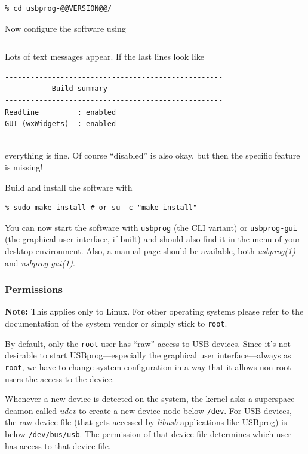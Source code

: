 \documentclass[bibtotoc,UKenglish,halfparskip,oneside,DIV12]{scrreprt}
\begin{document}
\begin{lstlisting}[style=inline]
% tar xvfj usbprog-@@VERSION@@.tar.bz2
% cd usbprog-@@VERSION@@/
\end{lstlisting}

Now configure the software using

\begin{lstlisting}[style=inline]
% ./configure
\end{lstlisting}

Lots of text messages appear. If the last lines look like

\begin{lstlisting}[style=inline]
---------------------------------------------------
           Build summary
---------------------------------------------------
Readline         : enabled
GUI (wxWidgets)  : enabled
---------------------------------------------------
\end{lstlisting}

everything is fine. Of course ``disabled'' is also okay, but then the specific feature is missing!

Build and install the software with

\begin{lstlisting}[style=inline]
% make
% sudo make install # or su -c "make install"
\end{lstlisting}

You can now start the software with \texttt{usbprog} (the CLI variant) or \texttt{usbprog-gui} (the
graphical user interface, if built) and should also find it in the menu of your desktop environment.
Also, a manual page should be available, both \emph{usbprog(1)} and \emph{usbprog-gui(1)}.

\subsubsection{Permissions}

\textbf{Note:} This applies only to Linux. For other operating systems please refer to the
documentation of the system vendor or simply stick to \texttt{root}.

By default, only the \texttt{root} user has ``raw'' access to USB devices. Since it's not desirable
to start USBprog---especially the graphical user interface---always as \texttt{root}, we have to
change system configuration in a way that it allows non-root users the access to the device.

Whenever a new device is detected on the system, the kernel asks a superspace deamon called
\emph{udev} to create a new device node below \texttt{/dev}. For USB devices, the raw device file
(that gets accessed by \emph{libusb} applications like USBprog) is below \texttt{/dev/bus/usb}. The
permission of that device file determines which user has access to that device file.
\end{document}
